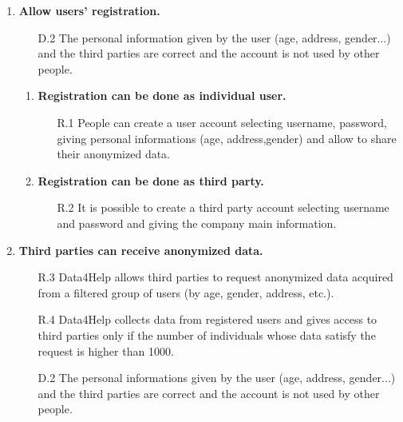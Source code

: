 \documentclass[a4paper]{article}
\begin{document}
    \begin{enumerate}[label*=\bf{G.\arabic*}]
        
        \item \textbf{Allow users’ registration.}
        \begin{enumerate}
            \item [D.2] The personal information given by the user (age, address, gender...) and the third parties are correct and the account is not used by other people. 
        \end{enumerate}
        
        \begin{enumerate}[label*=\bf{.\arabic*}]
            \item \textbf{Registration can be done as individual user.}
            \begin{enumerate}
                \item [R.1] People can create a user account selecting username, password, giving personal informations (age, address,gender) and allow to share their anonymized data.
                
            \end{enumerate}
            
            \item \textbf{Registration can be done as third party.}
            \begin{enumerate}
                \item [R.2] It is possible to create a third party account selecting username and password and giving the company main information.
            \end{enumerate}
        \end{enumerate}
        
        \item \textbf{Third parties can receive anonymized data.}
                
        \begin{enumerate}
            \item [R.3] Data4Help allows third parties to request anonymized data acquired from a filtered group of users (by age, gender, address, etc.).
            \item [R.4] Data4Help collects data from registered users and gives access to third parties only if the number of individuals whose data satisfy the request is higher than 1000.
            \item [D.2] The personal informations given by the user (age, address, gender...) and the third parties are correct and the account is not used by other people.
        \end{enumerate}
            

\end{enumerate}
\end{document}
